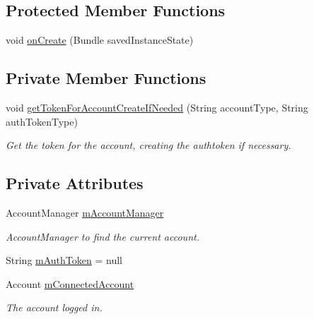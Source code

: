 \subsection*{Protected Member Functions}
\begin{DoxyCompactItemize}
\item 
void \hyperlink{classuk_1_1ac_1_1swan_1_1digitaltrails_1_1activities_1_1_launch_activity_a813750e4cb5b73eae2a8385547826d63}{on\+Create} (Bundle saved\+Instance\+State)
\end{DoxyCompactItemize}
\subsection*{Private Member Functions}
\begin{DoxyCompactItemize}
\item 
void \hyperlink{classuk_1_1ac_1_1swan_1_1digitaltrails_1_1activities_1_1_launch_activity_a5b2511b36e39bda71fbc1c9b2086cca5}{get\+Token\+For\+Account\+Create\+If\+Needed} (String account\+Type, String auth\+Token\+Type)
\begin{DoxyCompactList}\small\item\em Get the token for the account, creating the authtoken if necessary. \end{DoxyCompactList}\end{DoxyCompactItemize}
\subsection*{Private Attributes}
\begin{DoxyCompactItemize}
\item 
Account\+Manager \hyperlink{classuk_1_1ac_1_1swan_1_1digitaltrails_1_1activities_1_1_launch_activity_a22c2b6f53479392c1d9a3e5036149cf0}{m\+Account\+Manager}
\begin{DoxyCompactList}\small\item\em Account\+Manager to find the current account. \end{DoxyCompactList}\item 
String \hyperlink{classuk_1_1ac_1_1swan_1_1digitaltrails_1_1activities_1_1_launch_activity_a59bef1ccc5b3cf2d9801d36fd34fea31}{m\+Auth\+Token} = null
\item 
Account \hyperlink{classuk_1_1ac_1_1swan_1_1digitaltrails_1_1activities_1_1_launch_activity_ac396014effc4cb4bd931b6d6a15a1a73}{m\+Connected\+Account}
\begin{DoxyCompactList}\small\item\em The account logged in. \end{DoxyCompactList}\end{DoxyCompactItemize}
